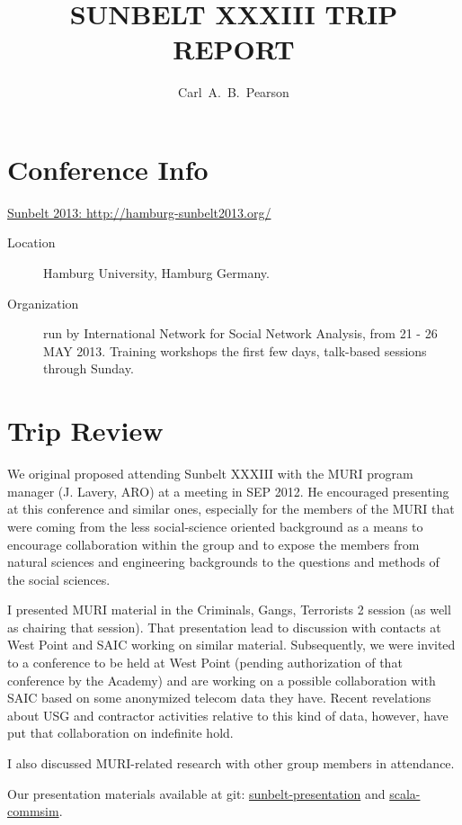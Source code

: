\documentclass{article}
\author{Carl~A.~B.~Pearson}
\begin{document}
\title{SUNBELT XXXIII TRIP REPORT}

\maketitle

\section*{Conference Info}
\href{http://hamburg-sunbelt2013.org/}{Sunbelt 2013: http://hamburg-sunbelt2013.org/}
\begin{description}
\item[Location] Hamburg University, Hamburg Germany.
\item[Organization] run by International Network for Social Network Analysis, from 21 - 26 MAY 2013.  Training workshops the first few days, talk-based sessions through Sunday.
\end{description}

\section*{Trip Review}
We original proposed attending Sunbelt XXXIII with the MURI program manager (J. Lavery, ARO) at a meeting in SEP 2012.  He encouraged presenting at this conference and similar ones, especially for the members of the MURI that were coming from the less social-science oriented background as a means to encourage collaboration within the group and to expose the members from natural sciences and engineering backgrounds to the questions and methods of the social sciences.

I presented MURI material in the Criminals, Gangs, Terrorists 2 session (as well as chairing that session).
That presentation lead to discussion with contacts at West Point and SAIC working on similar material.  Subsequently, we were invited to a conference to be held at West Point (pending authorization of that conference by the Academy) and are working on a possible collaboration with SAIC based on some anonymized telecom data they have.  Recent revelations about USG and contractor activities relative to this kind of data, however, have put that collaboration on indefinite hold.

I also discussed MURI-related research with other group members in attendance.

Our presentation materials available at git: \href{https://github.com/pearsonca/sunbelt13-presentation}{sunbelt-presentation} and \href{https://github.com/pearsonca/scala-commsim}{scala-commsim}.
\end{document}
